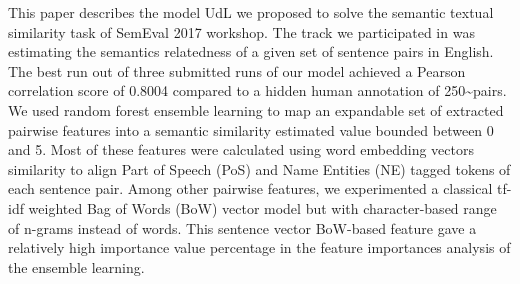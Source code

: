 This paper describes the model UdL we proposed to solve the semantic textual similarity task of SemEval 2017 workshop. The track we participated in was estimating the semantics relatedness of a given set of sentence pairs in English. The best run out of three submitted runs of our model achieved a Pearson correlation score of 0.8004 compared to a hidden human annotation of 250{\textasciitilde}pairs. We used random forest ensemble learning to map an expandable set of extracted pairwise features into a semantic similarity estimated value bounded between 0 and 5. Most of these features were calculated using word embedding vectors similarity to align Part of Speech (PoS) and Name Entities (NE) tagged tokens of each sentence pair. Among other pairwise features, we experimented a classical tf-idf weighted Bag of Words (BoW) vector model but with character-based range of n-grams instead of words. This sentence vector BoW-based feature gave a relatively high importance value percentage in the feature importances analysis of the ensemble learning.
